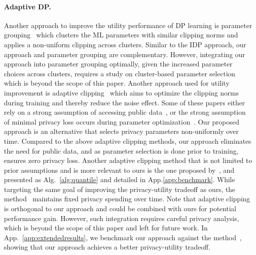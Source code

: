 \paragraph{Adaptive DP.} 
Another approach to improve the utility performance of DP learning is 
parameter grouping~\citep{yang2023dynamic, mcmahan2017learning} which clusters the ML parameters with similar clipping norms and applies a non-uniform clipping across clusters. Similar to the IDP approach, our approach and parameter grouping are complementary. However, integrating our approach into parameter grouping optimally, given the increased parameter choices across clusters, requires a study on cluster-based parameter selection which is beyond the scope of this paper. Another approach used for utility improvement is adaptive clipping~\citep{
pichapati2019adaclip, andrew2021differentially, li2022private} which aims to optimize the clipping norms during training and thereby reduce the noise effect. %
{Some of these papers either rely on a strong assumption of accessing public data~\citep{li2022private}, or the strong assumption of minimal privacy loss occurs during parameter optimization~\citep{pichapati2019adaclip}. Our proposed approach is an alternative that selects privacy parameters non-uniformly over time. Compared to the above adaptive clipping methods, our approach eliminates the need for public data, and as parameter selection is done prior to training, ensures zero privacy loss. Another adaptive clipping method that is not limited to prior assumptions and is more relevant to ours is the one proposed by~\citet{andrew2021differentially}, and presented as Alg.~\ref{alg:quantile} and detailed in App.\ref{app:benchmark}. While targeting the same goal of improving the privacy-utility tradeoff as ours, the method~\citep{andrew2021differentially} maintains fixed privacy spending over time. Note that adaptive clipping is orthogonal to our approach and could be combined with ours for potential performance gain. However, such integration requires careful privacy analysis, which is beyond the scope of this paper and left for future work. In App.~\ref{app:extendedresults}, we benchmark our approach against the method~\citep{andrew2021differentially}, showing that our approach achieves a better privacy-utility tradeoff.}